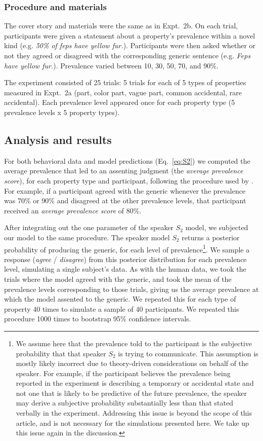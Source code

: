 \documentclass[12pt,letterpaper]{article}
\begin{document}
\subsubsection*{Procedure and materials}

The cover story and materials were the same as in Expt.~2b.
On each trial, participants were given a statement about a property's prevalence within a novel kind (e.g. \emph{50\% of feps have yellow fur.}). Participants were then asked whether or not they agreed or disagreed with the corresponding generic sentence (e.g. \emph{Feps have yellow fur.}). Prevalence varied between 10, 30, 50, 70, and 90\%.

The experiment consisted of 25 trials: 5 trials for each of 5 types of properties measured in Expt.~2a (part, color part, vague part, common accidental, rare accidental). 
Each prevalence level appeared once for each property type (5 prevalence levels x 5 property types). 

\subsection*{Analysis and results}

For both behavioral data and model predictions (Eq.~\ref{eq:S2}) we computed the average prevalence that led to an assenting judgment (the \emph{average prevalence score}), for each property type and participant, following the procedure used by .
For example, if a participant agreed with the generic whenever the prevalence was 70\% or 90\% and disagreed at the other prevalence levels, that participant received an \emph{average prevalence score} of 80\%.

After integrating out the one parameter of the speaker $S_2$ model, we subjected our model to the same procedure. 
The speaker model $S_2$ returns a posterior probability of producing the generic, for each level of prevalence\footnote{We assume here that the prevalence told to the participant is the subjective probability that that speaker $S_2$ is trying to communicate. This assumption is mostly likely incorrect due to theory-driven considerations on behalf of the speaker. For example, if the participant believes the prevalence being reported in the experiment is describing a temporary or accidental state and not one that is likely to be predictive of the future prevalence, the speaker may derive a subjective probability substantially less than that stated verbally in the experiment. Addressing this issue is beyond the scope of this article, and is not necessary for the simulations presented here. We take up this issue again in the discussion.}. 
We sample a response (\emph{agree} / \emph{disagree}) from this posterior distribution for each prevalence level, simulating a single subject's data.
As with the human data, we took the trials where the model agreed with the generic, and took the mean of the prevalence levels corresponding to those trials, giving us the average prevalence at which the model assented to the generic.
We repeated this for each type of property 40 times to simulate a sample of 40 participants. 
We repeated this procedure 1000 times to bootstrap 95\% confidence intervals.
\end{document}
